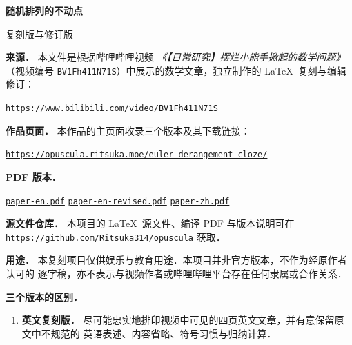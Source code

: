 \hypersetup{pageanchor=false}
\begin{titlepage}
\thispagestyle{empty}
\centering

\vspace*{1.2cm}

{\Huge\bfseries 随机排列的不动点\par}
\vspace{0.45cm}
{\Large 复刻版与修订版\par}

\vspace{1.1cm}

\begin{minipage}{0.86\textwidth}
\raggedright

\textbf{来源．}
本文件是根据哔哩哔哩视频
\emph{《【日常研究】摆烂小能手掀起的数学问题》}
（视频编号 \texttt{BV1Fh411N71S}）中展示的数学文章，独立制作的
\LaTeX\ 复刻与编辑修订：
\begin{center}
  \href{https://www.bilibili.com/video/BV1Fh411N71S}
       {\nolinkurl{https://www.bilibili.com/video/BV1Fh411N71S}}
\end{center}

\textbf{作品页面．}
本作品的主页面收录三个版本及其下载链接：
\begin{center}
  \href{https://opuscula.ritsuka.moe/euler-derangement-cloze/}
       {\nolinkurl{https://opuscula.ritsuka.moe/euler-derangement-cloze/}}
\end{center}

\textbf{PDF 版本．}
\begin{center}
  \small
  \href{https://opuscula.ritsuka.moe/euler-derangement-cloze/paper-en.pdf}
       {\texttt{paper-en.pdf}}
  \quad
  \href{https://opuscula.ritsuka.moe/euler-derangement-cloze/paper-en-revised.pdf}
       {\texttt{paper-en-revised.pdf}}
  \quad
  \href{https://opuscula.ritsuka.moe/euler-derangement-cloze/paper-zh.pdf}
       {\texttt{paper-zh.pdf}}
\end{center}

\smallskip
{\small
\textbf{源文件仓库．}
本项目的 \LaTeX\ 源文件、编译 PDF 与版本说明可在
\href{https://github.com/Ritsuka314/opuscula}
     {\nolinkurl{https://github.com/Ritsuka314/opuscula}} 获取．\par
}

\textbf{用途．}
本复刻项目仅供娱乐与教育用途．本项目并非官方版本，不作为经原作者认可的
逐字稿，亦不表示与视频作者或哔哩哔哩平台存在任何隶属或合作关系．

\medskip
\textbf{三个版本的区别．}
\begin{enumerate}
  \item \textbf{英文复刻版．}
    尽可能忠实地排印视频中可见的四页英文文章，并有意保留原文中不规范的
    英语表述、内容省略、符号习惯与归纳计算．


\end{enumerate}
\end{minipage}
\end{titlepage}
